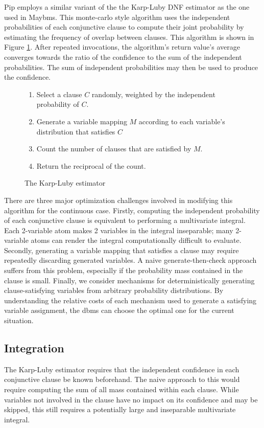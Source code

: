 Pip employs a similar variant of the the Karp-Luby DNF estimator as the one used in Maybms.  This monte-carlo style algorithm uses the independent probabilities of each conjunctive clause to compute their joint probability by estimating the frequency of overlap between clauses.  This algorithm is shown in Figure \ref{fig:karpluby}.  After repeated invocations, the algorithm's return value's average converges towards the ratio of the confidence to the sum of the independent probabilities.  The sum of independent probabilities may then be used to produce the confidence.

\begin{figure}
\footnotesize
\begin{center}
\begin{enumerate}
\item Select a clause $C$ randomly, weighted by the independent probability of $C$.
\item Generate a variable mapping $M$ according to each variable's distribution that satisfies $C$
\item Count the number of clauses that are satisfied by $M$.
\item Return the reciprocal of the count.
\end{enumerate}
\caption{The Karp-Luby estimator}
\label{fig:karpluby}
\end{center}
\end{figure}

There are three major optimization challenges involved in modifying this algorithm for the continuous case.  Firstly, computing the independent probability of each conjunctive clause is equivalent to performing a multivariate integral.  Each 2-variable atom makes 2 variables in the integral inseparable; many 2-variable atoms can render the integral computationally difficult to evaluate.  Secondly, generating a variable mapping that satisfies a clause may require repeatedly discarding generated variables.  A naive generate-then-check approach suffers from this problem, especially if the probability mass contained in the clause is small.  Finally, we consider mechanisms for deterministically generating clause-satisfying variables from arbitrary probability distributions.  By understanding the relative costs of each mechanism used to generate a satisfying variable assignment, the dbms can choose the optimal one for the current situation.

\subsection{Integration}
The Karp-Luby estimator requires that the independent confidence in each conjunctive clause be known beforehand.  The naive approach to this would require computing the sum of all mass contained within each clause.  While variables not involved in the clause have no impact on its confidence and may be skipped, this still requires a potentially large and inseparable multivariate integral.

